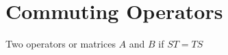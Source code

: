 \section{Commuting Operators}
\begin{mydef}
  Two operators or matrices $A$ and $B$  if $ST=TS$
\end{mydef}